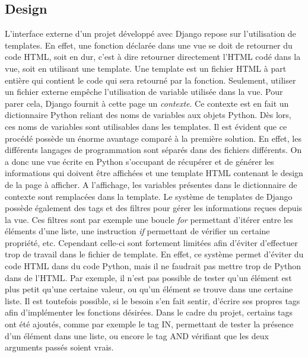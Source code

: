 \documentclass[12pt, a4paper, oneside]{article}
\begin{document}
\subsection{Design}
    \indent L'interface externe d'un projet développé avec Django repose sur l'utilisation de templates. En effet, une fonction déclarée dans une vue se doit de retourner du code HTML, soit en dur, c'est à dire retourner directement l'HTML codé dans la vue, soit en utilisant une template. Une template est un fichier HTML à part entière qui contient le code qui sera retourné par la fonction. Seulement, utiliser un fichier externe empêche l'utilisation de variable utilisée dans la vue. Pour parer cela, Django fournit à cette page un \textit{contexte}. Ce contexte est en fait un dictionnaire Python reliant des noms de variables aux objets Python. Dès lors, ces noms de variables sont utilisables dans les templates. Il est évident que ce procédé possède un énorme avantage comparé à la première solution. En effet, les différents langages de programmation sont séparés dans des fichiers différents. On a donc une vue écrite en Python s'occupant de récupérer et de générer les informations qui doivent être affichées et une template HTML contenant le design de la page à afficher. A l'affichage, les variables présentes dans le dictionnaire de contexte sont remplacées dans la template. Le système de templates de Django possède également des tags et des filtres pour gérer les informations reçues depuis la vue. Ces filtres sont par exemple une boucle \textit{for} permettant d'itérer entre les éléments d'une liste, une instruction \textit{if} permettant de vérifier un certaine propriété, etc. Cependant celle-ci sont fortement limitées afin d'éviter d'effectuer trop de travail dans le fichier de template. En effet, ce système permet d'éviter du code HTML dans du code Python, mais il ne faudrait pas mettre trop de Python dans de l'HTML. Par exemple, il n'est pas possible de tester qu'un élément est plus petit qu'une certaine valeur, ou qu'un élément se trouve dans une certaine liste. Il est toutefois possible, si le besoin s'en fait sentir, d'écrire ses propres tags afin d'implémenter les fonctions désirées. Dans le cadre du projet, certains tags ont été ajoutés, comme par exemple le tag IN, permettant de tester la présence d'un élément dans une liste, ou encore le tag AND vérifiant que les deux arguments passés soient vrais.\\\\
\end{document}
